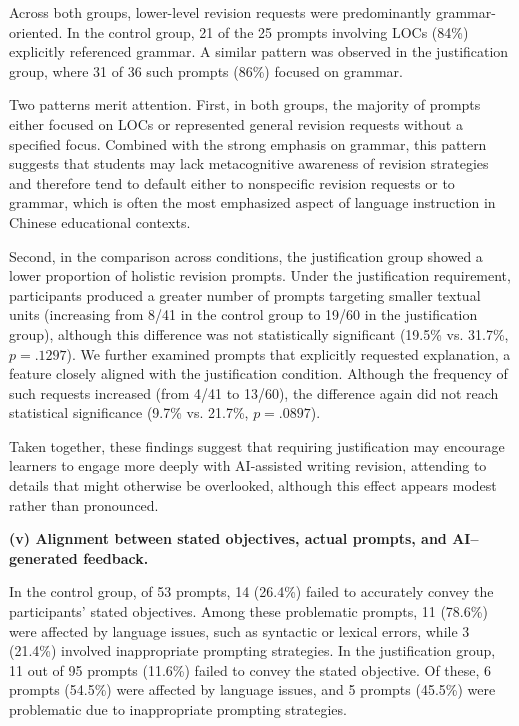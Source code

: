 \documentclass[english]{textolivre}
\begin{document}
Across both groups, lower-level revision requests were predominantly grammar-oriented. In the control group, 21 of the 25 prompts involving LOCs (84\%) explicitly referenced grammar. A similar pattern was observed in the justification group, where 31 of 36 such prompts (86\%) focused on grammar.

Two patterns merit attention. First, in both groups, the majority of prompts either focused on LOCs or represented general revision requests without a specified focus. Combined with the strong emphasis on grammar, this pattern suggests that students may lack metacognitive awareness of revision strategies and therefore tend to default either to nonspecific revision requests or to grammar, which is often the most emphasized aspect of language instruction in Chinese educational contexts.

Second, in the comparison across conditions, the justification group showed a lower proportion of holistic revision prompts. Under the justification requirement, participants produced a greater number of prompts targeting smaller textual units (increasing from 8/41 in the control group to 19/60 in the justification group), although this difference was not statistically significant (19.5\% vs. 31.7\%, $p = .1297$). We further examined prompts that explicitly requested explanation, a feature closely aligned with the justification condition. Although the frequency of such requests increased (from 4/41 to 13/60), the difference again did not reach statistical significance (9.7\% vs. 21.7\%, $p = .0897$). 

Taken together, these findings suggest that requiring justification may encourage learners to engage more deeply with AI-assisted writing revision, attending to details that might otherwise be overlooked, although this effect appears modest rather than pronounced.

\textbf{(v) Alignment between stated objectives, actual prompts, and AI–generated feedback.}

In the control group, of 53 prompts, 14 (26.4\%) failed to accurately convey the participants’ stated objectives. Among these problematic prompts, 11 (78.6\%) were affected by language issues, such as syntactic or lexical errors, while 3 (21.4\%) involved inappropriate prompting strategies. In the justification group, 11 out of 95 prompts (11.6\%) failed to convey the stated objective. Of these, 6 prompts (54.5\%) were affected by language issues, and 5 prompts (45.5\%) were problematic due to inappropriate prompting strategies.
\end{document}
